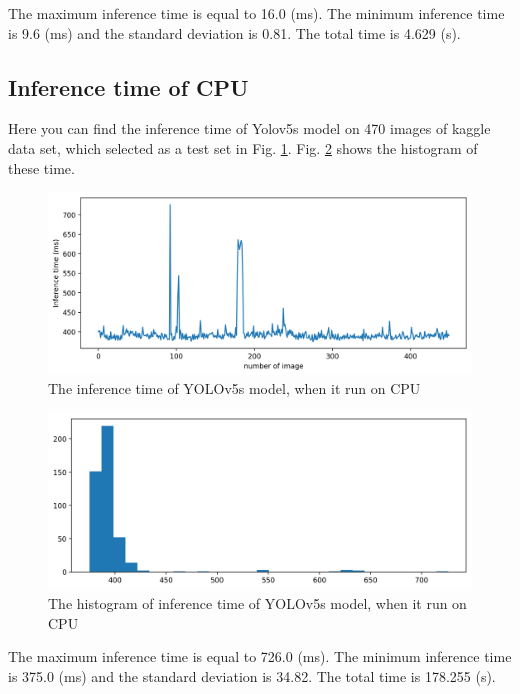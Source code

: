 \documentclass[12pt,a4paper]{article}
\begin{document}
The maximum inference time is equal to 16.0 (ms). The minimum inference time is 9.6 (ms) and the standard deviation is 0.81. The total time is 4.629 (s).

\subsection*{Inference time of CPU}
Here you can find the inference time of Yolov5s model on 470 images of kaggle data set, which selected as a test set in Fig. \ref{fig: cpus}. Fig. \ref{fig: cpus_hist} shows the histogram of these time.
\begin{figure}[H]
    \centering
    \includegraphics[width=15cm]{figures/Inftime_yolov5s_cpu.png}
    \caption{The inference time of YOLOv5s model, when it run on CPU}
    \label{fig: cpus}
\end{figure}
\begin{figure}[H]
    \centering
    \includegraphics[width=15cm]{figures/Inftime_yolov5s_cpu_hist.png}
    \caption{The histogram of inference time of YOLOv5s model, when it run on CPU}
    \label{fig: cpus_hist}
\end{figure}
The maximum inference time is equal to 726.0 (ms). The minimum inference time is 375.0 (ms) and the standard deviation is 34.82. The total time is 178.255 (s).
\end{document}
